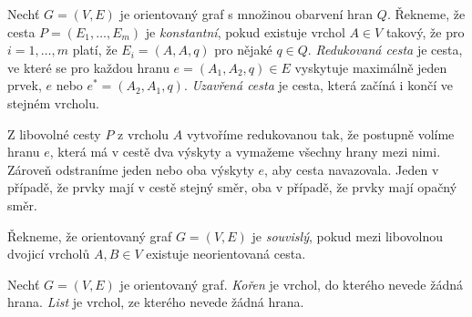 \begin{definice}
    Nechť $G = (V, E)$ je orientovaný graf s množinou obarvení hran $Q$. Řekneme, že cesta $P = (E_1, \dots, E_m)$
    je \emph{konstantní}, pokud existuje vrchol $A \in V$ takový, že pro $i = 1,\dots,m $ platí, že $E_i = (A,A,q)$ pro nějaké $q \in Q$. 
    \emph{Redukovaná cesta} je cesta, ve které se pro každou hranu $e = (A_1, A_2, q) \in E$ vyskytuje maximálně jeden prvek, $e$ nebo $e^* = (A_2, A_1, q)$.
    \emph{Uzavřená cesta} je cesta, která začíná i končí ve stejném vrcholu.
\end{definice}
\begin{pozn}\label{pozn-redukce-cesty}
    Z libovolné cesty $P$ z vrcholu $A$ vytvoříme redukovanou tak, že postupně volíme hranu $e$, která má v cestě dva  výskyty a vymažeme všechny hrany mezi nimi. Zároveň odstraníme jeden nebo oba  výskyty $e$, aby cesta navazovala. Jeden v případě, že prvky mají v cestě stejný směr, oba v případě, že prvky mají opačný směr.
    
\end{pozn}
    


\begin{definice}
    Řekneme, že orientovaný graf $G=(V,E)$ je \emph{souvislý}, pokud mezi libovolnou dvojicí vrcholů $A, B \in V$ existuje neorientovaná cesta.
\end{definice}

\begin{definice}
    Nechť $G = (V, E)$ je orientovaný graf. \emph{Kořen} je vrchol, do kterého nevede žádná hrana. \emph{List} je vrchol, ze kterého nevede žádná hrana.
\end{definice}


